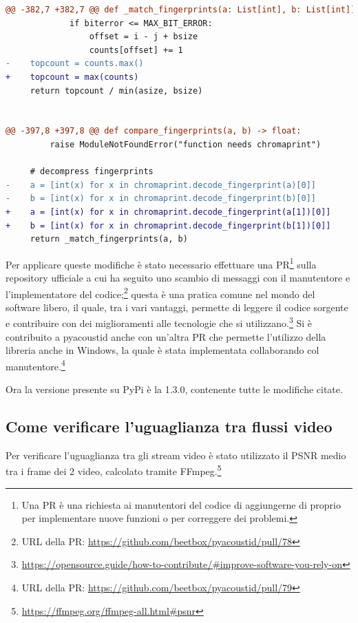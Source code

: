\begin{lstlisting}[language=diff]
@@ -382,7 +382,7 @@ def _match_fingerprints(a: List[int], b: List[int]) -> float:       
             if biterror <= MAX_BIT_ERROR:
                 offset = i - j + bsize
                 counts[offset] += 1
-    topcount = counts.max()
+    topcount = max(counts)
     return topcount / min(asize, bsize)


@@ -397,8 +397,8 @@ def compare_fingerprints(a, b) -> float:
         raise ModuleNotFoundError("function needs chromaprint")

     # decompress fingerprints
-    a = [int(x) for x in chromaprint.decode_fingerprint(a)[0]]
-    b = [int(x) for x in chromaprint.decode_fingerprint(b)[0]]
+    a = [int(x) for x in chromaprint.decode_fingerprint(a[1])[0]]
+    b = [int(x) for x in chromaprint.decode_fingerprint(b[1])[0]]
     return _match_fingerprints(a, b)
\end{lstlisting}

Per applicare queste modifiche è stato necessario effettuare una \ac{PR}\footnote{Una \ac{PR} è una richiesta ai manutentori del codice di aggiungerne di proprio per implementare nuove funzioni o per correggere dei problemi.} sulla repository ufficiale a cui ha seguito uno scambio di messaggi con il manutentore e l'implementatore del codice;\footnote{URL della \ac{PR}: \url{https://github.com/beetbox/pyacoustid/pull/78}} questa è una pratica comune nel mondo del software libero, il quale, tra i vari vantaggi, permette di leggere il codice sorgente e contribuire con dei miglioramenti alle tecnologie che si utilizzano.\footnote{\url{https://opensource.guide/how-to-contribute/\#improve-software-you-rely-on}}
Si è contribuito a pyacoustid anche con un'altra \ac{PR} che permette l'utilizzo della libreria anche in Windows, la quale è stata implementata collaborando col manutentore.\footnote{URL della \ac{PR}: \url{https://github.com/beetbox/pyacoustid/pull/79}}

Ora la versione presente su PyPi è la 1.3.0, contenente tutte le modifiche citate.


\subsection{Come verificare l'uguaglianza tra flussi video} \label{ssec:packager-video}    %
Per verificare l'uguaglianza tra gli stream video è stato utilizzato il \ac{PSNR} medio tra i frame dei 2 video, calcolato tramite FFmpeg.\footnote{\url{https://ffmpeg.org/ffmpeg-all.html\#psnr}}

